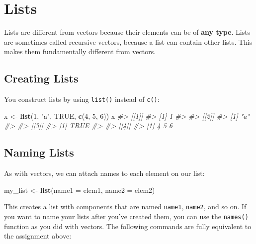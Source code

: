 \documentclass[]{book}
\newenvironment{Shaded}{\begin{snugshade}}{\end{snugshade}}
\newcommand{\KeywordTok}[1]{\textcolor[rgb]{0.13,0.29,0.53}{\textbf{#1}}}
\newcommand{\DataTypeTok}[1]{\textcolor[rgb]{0.13,0.29,0.53}{#1}}
\newcommand{\DecValTok}[1]{\textcolor[rgb]{0.00,0.00,0.81}{#1}}
\newcommand{\StringTok}[1]{\textcolor[rgb]{0.31,0.60,0.02}{#1}}
\newcommand{\CommentTok}[1]{\textcolor[rgb]{0.56,0.35,0.01}{\textit{#1}}}
\newcommand{\OtherTok}[1]{\textcolor[rgb]{0.56,0.35,0.01}{#1}}
\newcommand{\NormalTok}[1]{#1}
\begin{document}
\hypertarget{lists}{\section{Lists}\label{lists}}

Lists are different from vectors because their elements can be of
\textbf{any type}. Lists are sometimes called recursive vectors, because
a list can contain other lists. This makes them fundamentally different
from vectors.

\subsection{Creating Lists}\label{creating-lists}

You construct lists by using \texttt{list()} instead of \texttt{c()}:

\begin{Shaded}
\begin{Highlighting}[]
\NormalTok{x <-}\StringTok{ }\KeywordTok{list}\NormalTok{(}\DecValTok{1}\NormalTok{, }\StringTok{"a"}\NormalTok{, }\OtherTok{TRUE}\NormalTok{, }\KeywordTok{c}\NormalTok{(}\DecValTok{4}\NormalTok{, }\DecValTok{5}\NormalTok{, }\DecValTok{6}\NormalTok{))}
\NormalTok{x}
\CommentTok{#> [[1]]}
\CommentTok{#> [1] 1}
\CommentTok{#> }
\CommentTok{#> [[2]]}
\CommentTok{#> [1] "a"}
\CommentTok{#> }
\CommentTok{#> [[3]]}
\CommentTok{#> [1] TRUE}
\CommentTok{#> }
\CommentTok{#> [[4]]}
\CommentTok{#> [1] 4 5 6}
\end{Highlighting}
\end{Shaded}

\subsection{Naming Lists}\label{naming-lists}

As with vectors, we can attach names to each element on our list:

\begin{Shaded}
\begin{Highlighting}[]
\NormalTok{my_list <-}\StringTok{ }\KeywordTok{list}\NormalTok{(}\DataTypeTok{name1 =}\NormalTok{ elem1, }
                \DataTypeTok{name2 =}\NormalTok{ elem2)}
\end{Highlighting}
\end{Shaded}

This creates a list with components that are named \texttt{name1},
\texttt{name2}, and so on. If you want to name your lists after you've
created them, you can use the \texttt{names()} function as you did with
vectors. The following commands are fully equivalent to the assignment
above:
\end{document}
